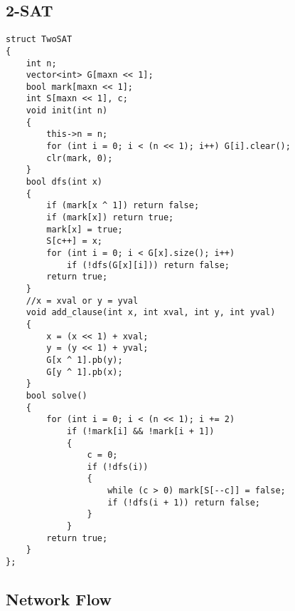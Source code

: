 \documentclass[twoside]{article}
\begin{document}
\subsection{2-SAT}
\begin{lstlisting}
struct TwoSAT
{
    int n;
    vector<int> G[maxn << 1];
    bool mark[maxn << 1];
    int S[maxn << 1], c;
    void init(int n)
    {
        this->n = n;
        for (int i = 0; i < (n << 1); i++) G[i].clear();
        clr(mark, 0);
    }
    bool dfs(int x)
    {
        if (mark[x ^ 1]) return false;
        if (mark[x]) return true;
        mark[x] = true;
        S[c++] = x;
        for (int i = 0; i < G[x].size(); i++)
            if (!dfs(G[x][i])) return false;
        return true;
    }
    //x = xval or y = yval
    void add_clause(int x, int xval, int y, int yval)
    {
        x = (x << 1) + xval;
        y = (y << 1) + yval;
        G[x ^ 1].pb(y);
        G[y ^ 1].pb(x);
    }
    bool solve()
    {
        for (int i = 0; i < (n << 1); i += 2)
            if (!mark[i] && !mark[i + 1])
            {
                c = 0;
                if (!dfs(i))
                {
                    while (c > 0) mark[S[--c]] = false;
                    if (!dfs(i + 1)) return false;
                }
            }
        return true;
    }
};
\end{lstlisting}
\subsection{Network Flow}
\end{document}

